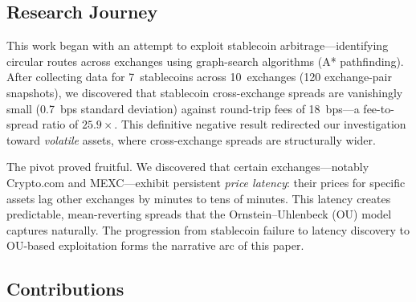 \documentclass[sigconf,nonacm=false]{acmart}
\begin{document}
\subsection{Research Journey}

This work began with an attempt to exploit stablecoin arbitrage---identifying circular routes across exchanges using graph-search algorithms (A* pathfinding). After collecting data for 7~stablecoins across 10~exchanges (120 exchange-pair snapshots), we discovered that stablecoin cross-exchange spreads are vanishingly small (0.7~bps standard deviation) against round-trip fees of 18~bps---a fee-to-spread ratio of $25.9\times$. This definitive negative result redirected our investigation toward \emph{volatile} assets, where cross-exchange spreads are structurally wider.

The pivot proved fruitful. We discovered that certain exchanges---notably Crypto.com and MEXC---exhibit persistent \emph{price latency}: their prices for specific assets lag other exchanges by minutes to tens of minutes. This latency creates predictable, mean-reverting spreads that the Ornstein--Uhlenbeck (OU) model captures naturally. The progression from stablecoin failure to latency discovery to OU-based exploitation forms the narrative arc of this paper.

\subsection{Contributions}
\end{document}
